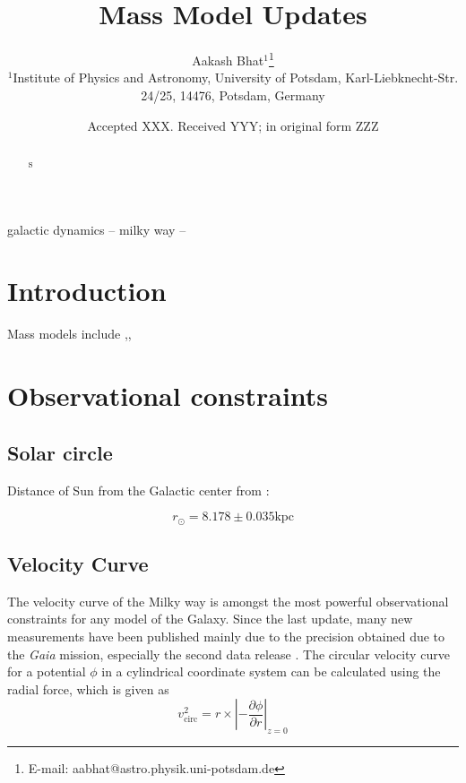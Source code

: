 \documentclass[fleqn,usenatbib]{mnras}
\title[Mass Model Updates]{Mass Model Updates}
\author[Aakash Bhat]{
Aakash Bhat$^{1}$\thanks{E-mail: aabhat@astro.physik.uni-potsdam.de}
\\
$^{1}$Institute of Physics and Astronomy, University of Potsdam, Karl-Liebknecht-Str. 24/25, 14476, Potsdam, Germany
}
\date{Accepted XXX. Received YYY; in original form ZZZ}
\begin{document}
\label{firstpage}
\pagerange{\pageref{firstpage}--\pageref{lastpage}}
\maketitle
\begin{abstract}


s

\end{abstract}


\begin{keywords}
galactic dynamics --
milky way --
\end{keywords}


   
   
\section{Introduction}

Mass models include \citet{2017MNRAS.465...76M},\citet{2017OAst...26...72B}, \citet{1998MNRAS.294..429D}
\section{Observational constraints}
\subsection{Solar circle}

Distance of Sun from the Galactic center from \citet{2019A&A...625L..10G} :

\begin{equation}
    r_\odot=8.178\pm 0.035 \mathrm{kpc}
\end{equation}

\subsection{Velocity Curve}

The velocity curve of the Milky way is amongst the most powerful observational constraints for any model of the Galaxy. Since the last update, many new measurements have been published mainly due to the precision obtained due to the \textit{Gaia} mission, especially the second data release \citet{2018A&A...616A...2L}. The circular velocity curve for a potential $\phi$ in a cylindrical coordinate system can be calculated using the radial force, which is given as
\begin{equation}
v^2_{\mathrm{circ}} = r\times|{-\frac{\partial\phi}{\partial r}}|_{z=0}
\end{equation}
\end{document}
